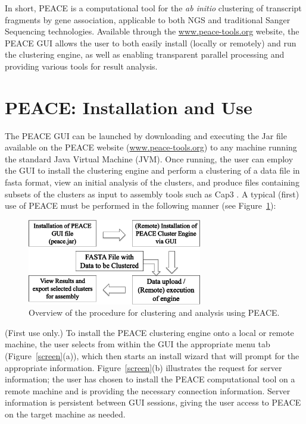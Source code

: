 \documentclass[a4,center,fleqn]{NAR}
\newcommand{\peace} {{\small PEACE}}
\newcommand{\capthree} {{\small Cap3}}
\begin{document}
In short, \peace\/ is a computational tool for the {\it ab initio}
clustering of transcript fragments by gene association, applicable to
both NGS and traditional Sanger Sequencing technologies.  Available
through the \href{http://www.peace-tools.org}{www.peace-tools.org}
website, the \peace\/ GUI allows the user to both easily install
(locally or remotely) and run the clustering engine, as well as
enabling transparent parallel processing and providing various tools
for result analysis.

\section{\peace\/: Installation and Use}

The \peace\/ GUI can be launched by downloading and executing the
Jar file available on the \peace\/ website
(\href{http://www.peace-tools.org}{www.peace-tools.org}) to any
machine running the standard Java Virtual Machine (JVM).  Once
running, the user can employ the GUI to install the clustering engine
and perform a clustering of a data file in {\sc fasta} format, view an
initial analysis of the clusters, and produce files containing subsets
of the clusters as input to assembly tools such as \capthree\/ 
\cite{Huang99}.  A typical (first) use of \peace\/ must be
performed in the following manner (see Figure~\ref{fig:workflow}):

\begin{figure}
  \centerline{\includegraphics[width=3in]{screen.d/workflow.pdf}}
  \caption{Overview of the procedure for clustering and analysis using
    PEACE.}\label{fig:workflow}
\end{figure}


 (First use only.) To install the
\peace\/ clustering engine onto a local or remote machine, the user selects
from within the GUI the appropriate menu tab (Figure~\ref{screen}(a)),
which then starts an install wizard that will prompt for the
appropriate information.  Figure~\ref{screen}(b) illustrates the
request for server information; the user has chosen to install the
\peace\/ computational tool on a remote machine and is providing
the necessary connection information.  Server information is
persistent between GUI sessions, giving the user access to \peace\/
on the target machine as needed.
\end{document}
